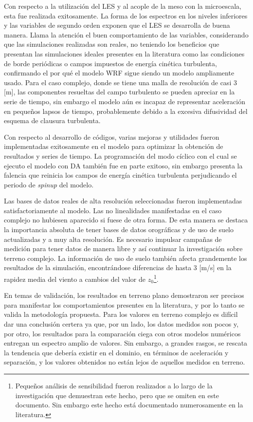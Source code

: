 \begin{itemize*}
	\item Con respecto a la utilización del LES y al acople de la meso con la microescala, esta fue realizada exitosamente. La forma de los espectros en los niveles inferiores y las variables de segundo orden exponen que el LES se desarrolla de buena manera. Llama la atención el buen comportamiento de las variables, considerando que las simulaciones realizadas son reales, no teniendo los beneficios que presentan las simulaciones ideales presentes en la literatura como las condiciones de borde periódicas o campos impuestos de energía cinética turbulenta, confirmando el por qué el modelo WRF sigue siendo un modelo ampliamente usado. Para el caso complejo, donde se tiene una malla de resolución de casi 3 [m], las componentes resueltas del campo turbulento se pueden apreciar en la serie de tiempo, sin embargo el modelo aún es incapaz de representar aceleración en pequeños lapsos de tiempo, probablemente debido a la excesiva difusividad del esquema de clausura turbulenta.
	\item Con respecto al desarrollo de códigos, varias mejoras y utilidades fueron implementadas exitosamente en el modelo para optimizar la obtención de resultados y series de tiempo. La programación del modo cíclico con el cual se ejecuto el modelo con DA también fue en parte exitoso, sin embargo presenta la falencia que reinicia los campos de energía cinética turbulenta perjudicando el periodo de \emph{spinup} del modelo.
	\item Las bases de datos reales de alta resolución seleccionadas fueron implementadas satisfactoriamente al modelo. Las no linealidades manifestadas en el caso complejo no hubiesen aparecido si fuese de otra forma. De esta manera se destaca la importancia absoluta de tener bases de datos orográficas y de uso de suelo actualizadas y a muy alta resolución. Es necesario impulsar campañas de medición para tener datos de manera libre y así continuar la investigación sobre terreno complejo. La información de uso de suelo también afecta grandemente los resultados de la simulación, encontrándose diferencias de hasta 3 [m/s] en la rapidez media del viento a cambios del valor de $z_0$\footnote{Pequeños análisis de sensibilidad fueron realizados a lo largo de la investigación que demuestran este hecho, pero que se omiten en este documento. Sin embargo este hecho está documentado numerosamente en la literatura.}.
	\item En temas de validación, los resultados en terreno plano demostraron ser precisos para manifestar los comportamientos presentes en la literatura, y por lo tanto se valida la metodología propuesta. Para los valores en terreno complejo es difícil dar una conclusión certera ya que, por un lado, los datos medidos son pocos y, por otro, los resultados para la comparación ciega con otros modelos numéricos entregan un espectro amplio de valores. Sin embargo, a grandes rasgos, se rescata la tendencia que debería existir en el dominio, en términos de aceleración y separación, y los valores obtenidos no están lejos de aquellos medidos en terreno.
\end{itemize*}
